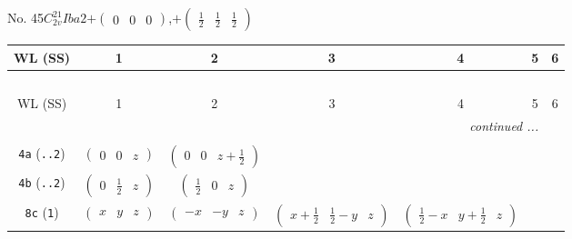 \documentclass[fleqn,9pt,landscape]{jsarticle}
\begin{document}
\newpage
No. 45\quad$C_{2v}^{21}$\quad$Iba2$\quad[ orthorhombic ]\quad$+\begin{pmatrix} 0 & 0 & 0 \end{pmatrix}$,\quad $+\begin{pmatrix} \frac{1}{2} & \frac{1}{2} & \frac{1}{2} \end{pmatrix}$
\begin{center}
\renewcommand{\arraystretch}{1.2}
\begin{longtable}{ccccccc}
 \hline \hline
WL (SS) & 1 & 2 & 3 & 4 & 5 & 6 \\ \hline \endfirsthead

\multicolumn{6}{l}{\tablename\ \thetable{}} \\
 \hline \hline
WL (SS) & 1 & 2 & 3 & 4 & 5 & 6 \\ \hline \endhead

 \hline \hline
\multicolumn{6}{r}{\footnotesize\it continued ...} \\ \endfoot

 \hline \hline
\multicolumn{6}{r}{} \\ \endlastfoot

{\tt 4a} ({\tt ..2}) & $ \begin{pmatrix} 0 & 0 & z \end{pmatrix} $ & $ \begin{pmatrix} 0 & 0 & z + \frac{1}{2} \end{pmatrix} $ & $  $ & $  $ \\ \hline
{\tt 4b} ({\tt ..2}) & $ \begin{pmatrix} 0 & \frac{1}{2} & z \end{pmatrix} $ & $ \begin{pmatrix} \frac{1}{2} & 0 & z \end{pmatrix} $ & $  $ & $  $ \\ \hline
{\tt 8c} ({\tt 1}) & $ \begin{pmatrix} x & y & z \end{pmatrix} $ & $ \begin{pmatrix} - x & - y & z \end{pmatrix} $ & $ \begin{pmatrix} x + \frac{1}{2} & \frac{1}{2} - y & z \end{pmatrix} $ & $ \begin{pmatrix} \frac{1}{2} - x & y + \frac{1}{2} & z \end{pmatrix} $ \\
\end{longtable}
\end{center}
\end{document}
